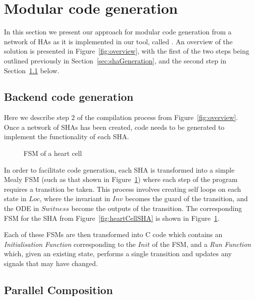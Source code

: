 \section{Modular code generation}
\label{sec:codeGen}

In this section we present our approach for modular code generation from a network of \acp{HA} as it is implemented in our tool, called \ourTool.
An overview of the solution is presented in Figure~\ref{fig:overview}, with the first of the two steps being outlined previously in Section~\ref{sec:shaGeneration}, and the second step in Section~\ref{sec:backendCodeGeneration} below.



\subsection{Backend code generation}
\label{sec:backendCodeGeneration}

Here we describe step $2$ of the compilation process from Figure~\ref{fig:overview}.
Once a network of \acp{SHA} has been created, code needs to be generated to implement the functionality of each \ac{SHA}.

\begin{figure}
	\centering
	
	\caption{\acf{FSM} of a heart cell \label{fig:heartCellFSM}}
\end{figure}

In order to facilitate code generation, each \ac{SHA} is transformed into a simple Mealy \ac{FSM} (such as that shown in Figure~\ref{fig:heartCellFSM}) where each step of the program requires a transition be taken.
This process involves creating self loops on each state in $Loc$, where the invariant in $Inv$ becomes the guard of the transition, and the \acs{ODE} in $Switness$ become the outputs of the transition.
The corresponding \ac{FSM} for the \ac{SHA} from Figure~\ref{fig:heartCellSHA} is shown in Figure~\ref{fig:heartCellFSM}.

Each of these \acp{FSM} are then transformed into C code which contains an \emph{Initialisation Function} corresponding to the $Init$ of the \ac{FSM}, and a \emph{Run Function} which, given an existing state, performs a single transition and updates any signals that may have changed.


\subsection{Parallel Composition}
\label{sec:composition}

